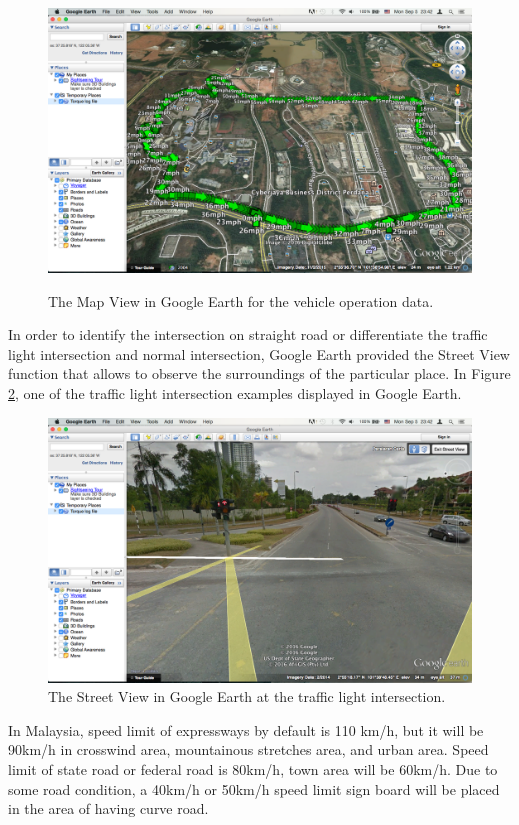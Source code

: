 \begin{figure}[hbt!]\centering
\includegraphics[width=.75\textwidth]{image/GEMapView}
\label{fig:GEMap}
\caption{The Map View in Google Earth for the vehicle operation data.}
\end{figure}

In order to identify the intersection on straight road or differentiate the traffic light intersection and normal intersection, Google Earth provided the Street View function that allows to observe the surroundings of the particular place. In Figure \ref{fig:GEStreet}, one of the traffic light intersection examples displayed in Google Earth. 

\begin{figure}[hbt!]\centering
\includegraphics[width=.75\textwidth]{image/GEStreetView}
\caption{The Street View in Google Earth at the traffic light intersection.}
\label{fig:GEStreet}
\end{figure}

In Malaysia, speed limit of expressways by default is 110 km/h, but it will be 90km/h in crosswind area, mountainous stretches area, and urban area. Speed limit of state road or federal road is 80km/h, town area will be 60km/h. Due to some road condition, a 40km/h or 50km/h speed limit sign board will be placed in the area of having curve road. 

